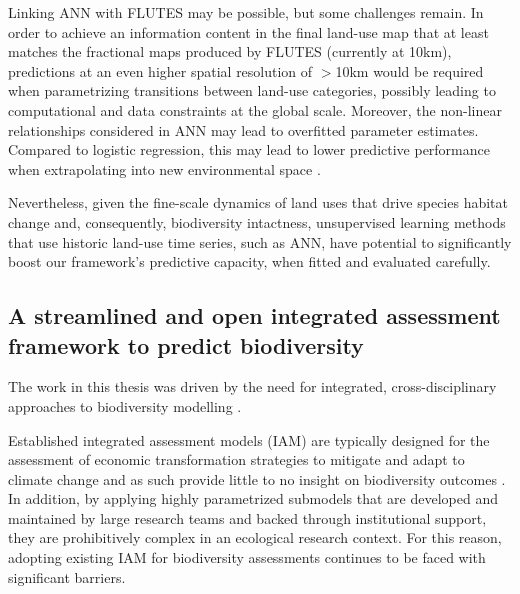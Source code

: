 \documentclass[titlesmallcaps,copyrightpage]{uomthesis}\usepackage[]{graphicx}\usepackage[]{color}
\begin{document}
Linking ANN with FLUTES may be possible, but some challenges remain. In order to achieve an information content in the final land-use map that at least matches the fractional maps produced by FLUTES (currently at 10km), predictions at an even higher spatial resolution of \(>\)10km would be required when parametrizing transitions between land-use categories, possibly leading to computational and data constraints at the global scale. Moreover, the non-linear relationships considered in ANN may lead to overfitted parameter estimates. Compared to logistic regression, this may lead to lower predictive performance when extrapolating into new environmental space \citep{dreiseitl_logistic_2002}.

Nevertheless, given the fine-scale dynamics of land uses that drive species habitat change and, consequently, biodiversity intactness, unsupervised learning methods that use historic land-use time series, such as ANN, have potential to significantly boost our framework's predictive capacity, when fitted and evaluated carefully.

\subsection{A streamlined and open integrated assessment framework to predict biodiversity}

The work in this thesis was driven by the need for integrated, cross-disciplinary approaches to biodiversity modelling \citep{ipbes_summary_2016, ipbes_summary_2019}. 

Established integrated assessment models (IAM) are typically designed for the assessment of economic transformation strategies to mitigate and adapt to climate change and as such provide little to no insight on biodiversity outcomes \citep{harfoot_integrated_2014}. In addition, by applying highly parametrized submodels that are developed and maintained by large research teams and backed through institutional support, they are prohibitively complex in an ecological research context. For this reason, adopting existing IAM for biodiversity assessments continues to be faced with significant barriers. 
\end{document}
